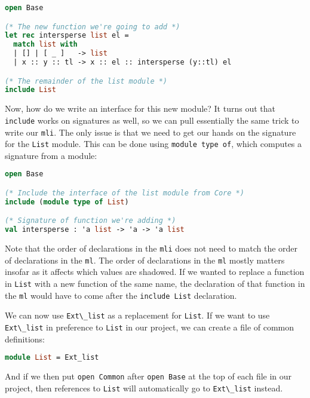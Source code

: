 \begin{lstlisting}[language=Caml]
open Base

(* The new function we're going to add *)
let rec intersperse list el =
  match list with
  | [] | [ _ ]   -> list
  | x :: y :: tl -> x :: el :: intersperse (y::tl) el

(* The remainder of the list module *)
include List
\end{lstlisting}

Now, how do we write an interface for this new module? It turns out that
\passthrough{\lstinline!include!} works on signatures as well, so we can
pull essentially the same trick to write our
\passthrough{\lstinline!mli!}. The only issue is that we need to get our
hands on the signature for the \passthrough{\lstinline!List!} module.
This can be done using \passthrough{\lstinline!module type of!}, which
computes a signature from a module:

\begin{lstlisting}[language=Caml]
open Base

(* Include the interface of the list module from Core *)
include (module type of List)

(* Signature of function we're adding *)
val intersperse : 'a list -> 'a -> 'a list
\end{lstlisting}

Note that the order of declarations in the \passthrough{\lstinline!mli!}
does not need to match the order of declarations in the
\passthrough{\lstinline!ml!}. The order of declarations in the
\passthrough{\lstinline!ml!} mostly matters insofar as it affects which
values are shadowed. If we wanted to replace a function in
\passthrough{\lstinline!List!} with a new function of the same name, the
declaration of that function in the \passthrough{\lstinline!ml!} would
have to come after the \passthrough{\lstinline!include List!}
declaration.

We can now use \passthrough{\lstinline!Ext\_list!} as a replacement for
\passthrough{\lstinline!List!}. If we want to use
\passthrough{\lstinline!Ext\_list!} in preference to
\passthrough{\lstinline!List!} in our project, we can create a file of
common definitions:

\begin{lstlisting}[language=Caml]
module List = Ext_list
\end{lstlisting}

And if we then put \passthrough{\lstinline!open Common!} after
\passthrough{\lstinline!open Base!} at the top of each file in our
project, then references to \passthrough{\lstinline!List!} will
automatically go to \passthrough{\lstinline!Ext\_list!} instead.

